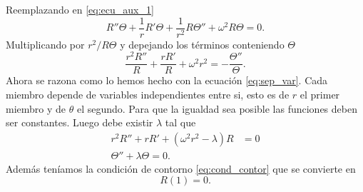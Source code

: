 \documentclass{article}
\begin{document}
Reemplazando en \eqref{eq:ecu_aux_1}
\begin{equation*}\label{eq:ecua_aux_2} 
R''\Theta +\frac{1}{r}R'\Theta+\frac{1}{r^2}R\Theta''+\omega^2R\Theta=0.
\end{equation*}
Multiplicando por $r^2/R\Theta$ y depejando los términos conteniendo $\Theta$
\begin{equation}\label{eq:ecua_aux_3} 
\frac{r^2R''}{R} +\frac{rR'}{R}+\omega^2r^2=-\frac{\Theta''}{\Theta}.
\end{equation}
Ahora se razona como lo hemos hecho con la ecuación \eqref{eq:sep_var}. Cada miembro depende de variables independientes entre si, esto es de $r$ el primer miembro y de $\theta$ el segundo. Para que la igualdad sea posible las funciones deben ser constantes. Luego debe existir $\lambda$ tal que
\begin{align}
r^2R'' +rR'+(\omega^2r^2-\lambda) R&=0\label{eq:ecua_aux_4}\\
\Theta'' +\lambda\Theta=0\label{eq:ecua_aux_5}.
\end{align}
Además teníamos la condición de contorno \eqref{eq:cond_contor} que se convierte en 
\begin{equation}\label{eq:cond_contor}
R(1)=0.
\end{equation}
\end{document}
